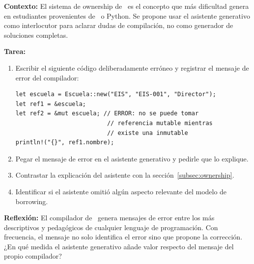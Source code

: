 \begin{tcolorbox}[actividadIA, title={Actividad IA — Sprint 8: Ownership y el asistente generativo}]
\textbf{Contexto:} El sistema de ownership de \rust\ es el concepto que más
dificultad genera en estudiantes provenientes de \java\ o Python. Se propone
usar el asistente generativo como interlocutor para aclarar dudas de compilación,
no como generador de soluciones completas.

\vspace{6pt}
\textbf{Tarea:}
\begin{enumerate}
  \item Escribir el siguiente código deliberadamente erróneo y registrar el
  mensaje de error del compilador:
\begin{lstlisting}[style=rustStyle, numbers=none]
let escuela = Escuela::new("EIS", "EIS-001", "Director");
let ref1 = &escuela;
let ref2 = &mut escuela; // ERROR: no se puede tomar
                          // referencia mutable mientras
                          // existe una inmutable
println!("{}", ref1.nombre);
\end{lstlisting}
  \item Pegar el mensaje de error en el asistente generativo y pedirle que lo explique.
  \item Contrastar la explicación del asistente con la sección~\ref{subsec:ownership}.
  \item Identificar si el asistente omitió algún aspecto relevante del modelo de borrowing.
\end{enumerate}

\vspace{6pt}
\textbf{Reflexión:} El compilador de \rust\ genera mensajes de error entre los más
descriptivos y pedagógicos de cualquier lenguaje de programación. Con frecuencia,
el mensaje no solo identifica el error sino que propone la corrección. ¿En qué
medida el asistente generativo añade valor respecto del mensaje del propio compilador?
\end{tcolorbox}

\vspace{10pt}


